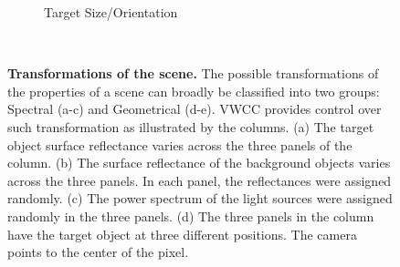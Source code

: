\documentclass{jov}
\begin{document}
\begin{figure}
\begin{subfigure}[b]{0.18 \textwidth}
        \caption{Target Size/Orientation}
        \label{fig:targetSizeOrientation}
    \end{subfigure}
    ~
    \caption{{\bf Transformations of the scene.} The possible transformations of the properties of a scene can broadly be classified into two groups: Spectral (a-c) and Geometrical (d-e). VWCC provides control over such transformation as illustrated by the columns. (a) The target object surface reflectance varies across the three panels of the column. (b) The surface reflectance of the background objects varies across the three panels. In each panel, the reflectances were assigned randomly. (c) The power spectrum of the light sources were assigned randomly in the three panels. (d) The three panels in the column have the target object at three different positions. The camera points to the center of the pixel.
\label{fig:VWCCTransformations}}
\end{figure}

\end{document}
